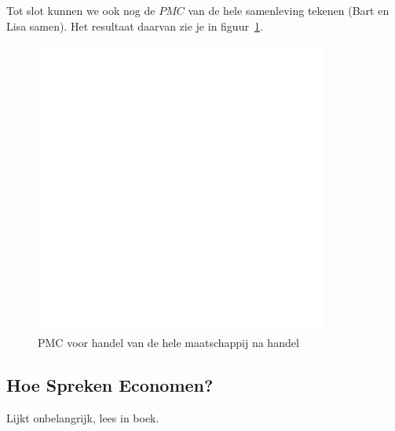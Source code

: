 Tot slot kunnen we ook nog de $PMC$ van de hele samenleving tekenen (Bart en Lisa samen). Het resultaat daarvan zie je in figuur~\ref{fig:pmcHandel}.
\begin{figure}[htbp]
	\centering
	\includegraphics[scale=0.4]{Images/white.png}
	\caption{PMC voor handel van de hele maatschappij na handel}
	\label{fig:pmcHandel}
\end{figure}


\subsection{Hoe Spreken Economen?}
Lijkt onbelangrijk, lees in boek.

